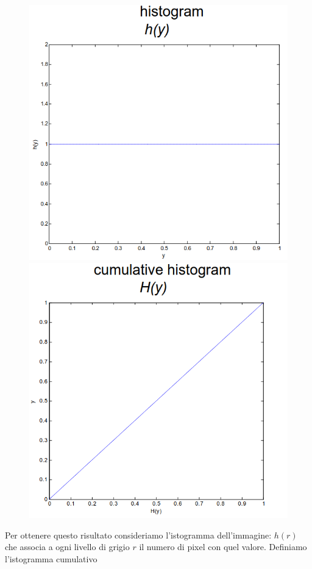 \begin{figure}
	\vspace{-.4cm}
	\centering
	\includegraphics[width=.9\linewidth]{Picture/Histogram_EQ1}
	\includegraphics[width=.9\linewidth]{Picture/Histogram_EQ2}
\end{figure}
Per ottenere questo risultato consideriamo l'istogramma dell'immagine: $h(r)$ che associa a ogni livello di grigio $r$ il numero di pixel con quel valore. Definiamo l'istogramma cumulativo
